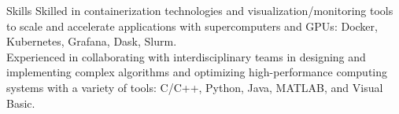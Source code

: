 \documentclass{resume} %
\begin{document}

\begin{rSection}{Skills}
Skilled in containerization technologies and visualization/monitoring tools to scale and accelerate applications with supercomputers and GPUs: Docker, Kubernetes, Grafana, Dask, Slurm.\\
Experienced in collaborating with interdisciplinary teams in designing and implementing complex algorithms and optimizing high-performance computing systems with a variety of tools: C/C++, Python, Java, MATLAB, and Visual Basic.
\end{rSection}

\end{document}
